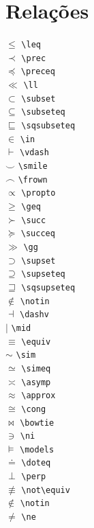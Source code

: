 \documentclass[xindy,draft]{fei}
\begin{document}
\section{Relações}
\begin{multicols}{3}
\noindent
\(\leq\) \verb+\leq+\\
\(\prec\) \verb+\prec+\\
\(\preceq\) \verb+\preceq+\\
\(\ll\) \verb+\ll+\\
\(\subset\) \verb+\subset+\\
\(\subseteq\) \verb+\subseteq+\\
\(\sqsubseteq\) \verb+\sqsubseteq+\\
\(\in\) \verb+\in+\\
\(\vdash\) \verb+\vdash+\\
\(\smile\) \verb+\smile+\\
\(\frown\) \verb+\frown+\\
\(\propto\) \verb+\propto+\\
\(\geq\) \verb+\geq+\\
\(\succ\) \verb+\succ+\\
\(\succeq\) \verb+\succeq+\\
\(\gg\) \verb+\gg+\\
\(\supset\) \verb+\supset+\\
\(\supseteq\) \verb+\supseteq+\\
\(\sqsupseteq\) \verb+\sqsupseteq+\\
\(\notin\) \verb+\notin+\\
\(\dashv\) \verb+\dashv+\\
\(\mid\) \verb+\mid+\\
\(\equiv\) \verb+\equiv+\\
\(\sim\) \verb+\sim+\\
\(\simeq\) \verb+\simeq+\\
\(\asymp\) \verb+\asymp+\\
\(\approx\) \verb+\approx+\\
\(\cong\) \verb+\cong+\\
\(\bowtie\) \verb+\bowtie+\\
\(\ni\) \verb+\ni+\\
\(\models\) \verb+\models+\\
\(\doteq\) \verb+\doteq+\\
\(\perp\) \verb+\perp+\\
\(\not\equiv\) \verb+\not\equiv+\\
\(\notin\) \verb+\notin+\\
\(\ne\) \verb+\ne+\\
\end{multicols}
\end{document}
